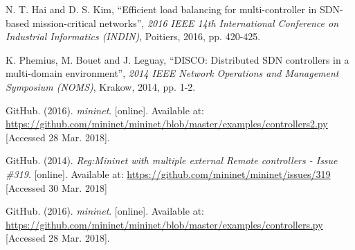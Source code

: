 \documentclass[12pt, a4paper]{article}
\begin{document}




\begin{thebibliography}{99}
  \footnotesize

  N. T. Hai and D. S. Kim,
  ``Efficient load balancing for multi-controller in SDN-based mission-critical networks'',
  \textit{2016 IEEE 14th International Conference on Industrial Informatics (INDIN)},
  Poitiers,
  2016,
  pp. 420-425.

  K. Phemius, M. Bouet and J. Leguay,
  ``DISCO: Distributed SDN controllers in a multi-domain environment'',
  \textit{2014 IEEE Network Operations and Management Symposium (NOMS)},
  Krakow,
  2014,
  pp. 1-2.

  GitHub. (2016).
  \textit{mininet}. [online].
  Available at: \url{https://github.com/mininet/mininet/blob/master/examples/controllers2.py}
  [Accessed 28 Mar. 2018].

  GitHub. (2014).
  \textit{Reg:Mininet with multiple external Remote controllers - Issue \#319}. [online].
  Available at: \url{https://github.com/mininet/mininet/issues/319}
  [Accessed 30 Mar. 2018]

  GitHub. (2016).
  \textit{mininet}. [online].
  Available at: \url{https://github.com/mininet/mininet/blob/master/examples/controllers.py}
  [Accessed 28 Mar. 2018].
\end{thebibliography}
\end{document}
